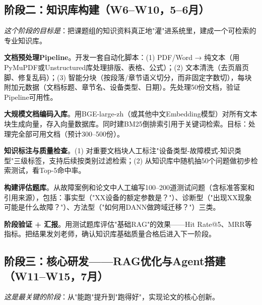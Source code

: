 \documentclass[a4paper, 11pt]{ctexart}
\begin{document}
\subsection{阶段二：知识库构建（W6--W10，5--6月）}

\noindent\textit{这个阶段的目标是}：把课题组的知识资料真正地"灌"进系统里，建成一个可检索的专业知识库。

\begin{description}[style=nextline, leftmargin=1.2cm, labelwidth=1cm, font=\bfseries\color{tsinghua}]
\item[W6] \textbf{文档预处理Pipeline}。开发一套自动化脚本：(1) PDF/Word → 纯文本（用PyMuPDF或Unstructured库处理排版、表格、公式）；(2) 文本清洗（去页眉页脚、修复乱码）；(3) 智能分块（按段落/章节语义切分，而非固定字数切），每块附加元数据（文档标题、章节名、设备类型、日期）。先处理50份文档，验证Pipeline可用性。
\item[W7] \textbf{大规模文档编码入库}。用BGE-large-zh（或其他中文Embedding模型）对所有文本块生成向量，存入向量数据库。同时建BM25倒排索引用于关键词检索。目标：处理完全部可用文档（预计300--500份）。
\item[W8] \textbf{知识标注与质量检查}。(1) 对重要文档块人工标注"设备类型-故障模式-知识类型"三级标签，支持后续按类别过滤检索；(2) 从知识库中随机抽50个问题做初步检索测试，看Top-5命中率。
\item[W9] \textbf{构建评估题库}。从故障案例和论文中人工编写100--200道测试问题（含标准答案和引用来源），包括：事实型（"XX设备的额定参数是？"）、诊断型（"出现XX现象可能是什么故障？"）、方法型（"如何用DANN做跨域迁移？"）三类。
\item[W10] \textbf{阶段验证 + 汇报}。用测试题库评估"基础RAG"的效果——Hit Rate@5、MRR等指标。把结果发刘老师，确认知识库基础质量合格后进入下一阶段。
\end{description}

\subsection{阶段三：核心研发——RAG优化与Agent搭建（W11--W15，7月）}

\noindent\textit{这是最关键的阶段}：从"能跑"提升到"跑得好"，实现论文的核心创新。
\end{document}
